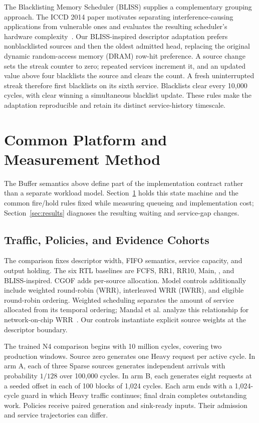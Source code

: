 The Blacklisting Memory Scheduler (BLISS) supplies a complementary grouping approach. The ICCD 2014 paper motivates separating interference-causing applications from vulnerable ones and evaluates the resulting scheduler's hardware complexity~\cite{bliss}. Our BLISS-inspired descriptor adaptation prefers nonblacklisted sources and then the oldest admitted head, replacing the original dynamic random-access memory (DRAM) row-hit preference. A source change sets the streak counter to zero; repeated services increment it, and an updated value above four blacklists the source and clears the count. A fresh uninterrupted streak therefore first blacklists on its sixth service. Blacklists clear every 10,000 cycles, with clear winning a simultaneous blacklist update. These rules make the adaptation reproducible and retain its distinct service-history timescale.

\section{Common Platform and Measurement Method}
\label{sec:method}
The Buffer semantics above define part of the implementation contract rather than a separate workload model. Section~\ref{sec:method} holds this state machine and the common fire/hold rules fixed while measuring queueing and implementation cost; Section~\ref{sec:results} diagnoses the resulting waiting and service-gap changes.
\subsection{Traffic, Policies, and Evidence Cohorts}
The comparison fixes descriptor width, FIFO semantics, service capacity, and output holding. The six RTL baselines are FCFS, RR1, RR10, Main, \Alg, and BLISS-inspired. CGOF adds per-source allocation. Model controls additionally include weighted round-robin (WRR), interleaved WRR (IWRR), and eligible round-robin ordering. Weighted scheduling separates the amount of service allocated from its temporal ordering; Mandal et al. analyze this relationship for network-on-chip WRR~\cite{wrr_mandal}. Our controls instantiate explicit source weights at the descriptor boundary.

The trained N4 comparison begins with 10 million cycles, covering two production windows. Source zero generates one Heavy request per active cycle. In arm A, each of three Sparse sources generates independent arrivals with probability $1/128$ over 100,000 cycles. In arm B, each generates eight requests at a seeded offset in each of 100 blocks of 1,024 cycles. Each arm ends with a 1,024-cycle guard in which Heavy traffic continues; final drain completes outstanding work. Policies receive paired generation and sink-ready inputs. Their admission and service trajectories can differ.

